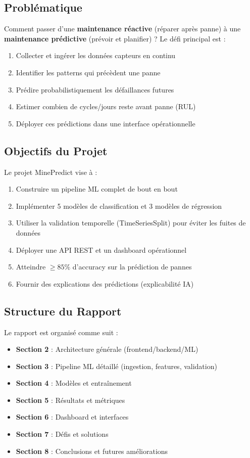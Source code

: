 \documentclass[12pt,a4paper,french]{article}
\begin{document}
\subsection{Problématique}

Comment passer d'une \textbf{maintenance réactive} (réparer après panne) à une \textbf{maintenance prédictive} (prévoir et planifier) ? Le défi principal est :

\begin{enumerate}
    \item Collecter et ingérer les données capteurs en continu
    \item Identifier les patterns qui précèdent une panne
    \item Prédire probabilistiquement les défaillances futures
    \item Estimer combien de cycles/jours reste avant panne (RUL)
    \item Déployer ces prédictions dans une interface opérationnelle
\end{enumerate}

\subsection{Objectifs du Projet}

Le projet MinePredict vise à :

\begin{enumerate}
    \item Construire un pipeline ML complet de bout en bout
    \item Implémenter 5 modèles de classification et 3 modèles de régression
    \item Utiliser la validation temporelle (TimeSeriesSplit) pour éviter les fuites de données
    \item Déployer une API REST et un dashboard opérationnel
    \item Atteindre $\geq 85\%$ d'accuracy sur la prédiction de pannes
    \item Fournir des explications des prédictions (explicabilité IA)
\end{enumerate}

\subsection{Structure du Rapport}

Le rapport est organisé comme suit :
\begin{itemize}
    \item \textbf{Section 2} : Architecture générale (frontend/backend/ML)
    \item \textbf{Section 3} : Pipeline ML détaillé (ingestion, features, validation)
    \item \textbf{Section 4} : Modèles et entraînement
    \item \textbf{Section 5} : Résultats et métriques
    \item \textbf{Section 6} : Dashboard et interfaces
    \item \textbf{Section 7} : Défis et solutions
    \item \textbf{Section 8} : Conclusions et futures améliorations
\end{itemize}
\end{document}
